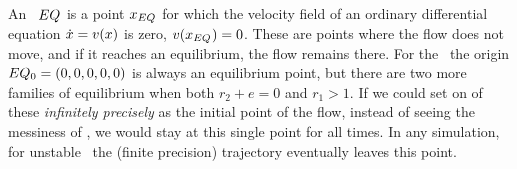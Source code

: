 {\section{\Eqva}

An \eqv\ $EQ_{}$ is a point $x_{EQ_{}}$ for which the
velocity field of an ordinary differential equation
$\dot{x} = v(x)$ is zero, $v(x_{EQ_{}})=0$. These
are points where the flow does not move, and if it reaches an
equilibrium, the flow remains there. For the \cLe\, the origin $EQ_{0}=(0, 0, 0, 0,
0)$ is always an equilibrium point, but there are two more families of equilibrium when both $r_2 + e=0$ and $r_1>1$. If we could set on of these {\em infinitely precisely} as the
initial point of the flow, instead of seeing the messiness of
, we would stay at this single point for
all times. In any simulation, for unstable \reqv\
the (finite precision) trajectory eventually leaves this point.

}
